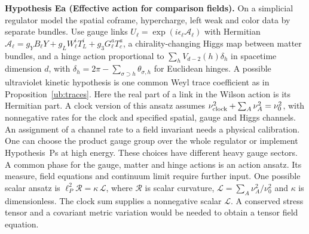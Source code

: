 \documentclass[aps,pra,onecolumn,superscriptaddress,nofootinbib,10pt]{revtex4-2}
\theoremstyle{definition}
\theoremstyle{remark}
\begin{document}
\smallskip\noindent\textbf{Hypothesis Ea (Effective action for comparison fields).}  On a simplicial regulator model the spatial coframe, hypercharge, left
weak and color data by separate bundles. Use gauge links
$U_\ell=\exp(i\epsilon_\ell \mathcal A_\ell)$ with Hermitian
$\mathcal A_\ell=g_YB_\ell Y+g_LW_\ell^i T_L^i+g_3G_\ell^aT_c^a$,
a chirality-changing Higgs map between matter bundles, and a hinge
action proportional to $\sum_h V_{d-2}(h)\delta_h$ in spacetime dimension
$d$, with $\delta_h=2\pi-\sum_{\sigma\supset h}\theta_{\sigma,h}$ for
Euclidean hinges. A possible ultraviolet kinetic hypothesis is one common
Weyl trace coefficient as in Proposition~\ref{ub:traces}. Here the real part of a link in the Wilson action is its Hermitian part.
A clock version of this ansatz assumes
$\nu_{\rm clock}^2+\sum_A\nu_A^2=\nu_0^2$, with nonnegative rates
for the clock and specified spatial, gauge and Higgs channels.
An assignment of a channel rate to a field invariant needs a physical
calibration. One can choose the product gauge group over the whole regulator or implement
Hypothesis~Ps at high energy. These choices have different
heavy gauge sectors. A common phase for the gauge, matter and hinge actions
is an action ansatz. Its measure, field equations and continuum limit require further input.
One possible scalar ansatz is $\ell_P^2\mathcal R=\kappa\,\mathcal L$,
where $\mathcal R$ is scalar curvature,
$\mathcal L=\sum_A\nu_A^2/\nu_0^2$ and $\kappa$ is dimensionless.
The clock sum supplies a nonnegative scalar $\mathcal L$.
A conserved stress tensor and a covariant metric variation would be
needed to obtain a tensor field equation. \cite{ub:regge,ub:wilson,n7:CC}
\end{document}
